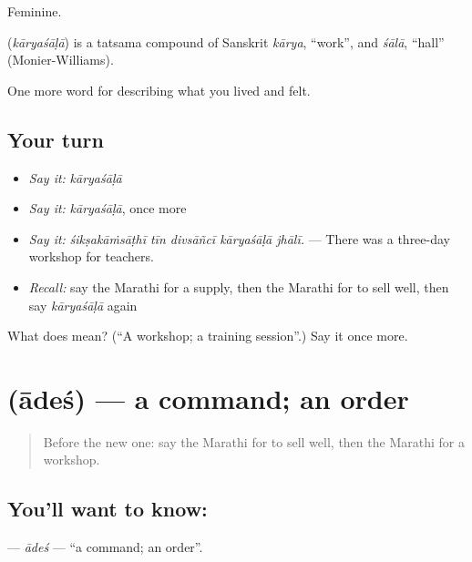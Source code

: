 Feminine.

\begin{cousinweb}
\textbf{} (\emph{kāryaśāḷā}) is a tatsama compound of Sanskrit \emph{kārya}, \textquotedblleft{}work\textquotedblright{}, and \emph{śālā}, \textquotedblleft{}hall\textquotedblright{} (Monier-Williams).
\end{cousinweb}

\begin{grammarlens}[title={What you've built}]
One more word for describing what you lived and felt.
\end{grammarlens}

\subsection*{Your turn}
\begin{itemize}
\raggedright
  \item \emph{Say it:} \emph{kāryaśāḷā}
  \item \emph{Say it:} \emph{kāryaśāḷā}, once more
  \item \emph{Say it:} \emph{śikṣakāṁsāṭhī tīn divsāñcī kāryaśāḷā jhālī.} — There was a three-day workshop for teachers.
  \item \emph{Recall:} say the Marathi for a supply, then the Marathi for to sell well, then say \emph{kāryaśāḷā} again
\end{itemize}

\begin{tcolorbox}[breakable,colback=teal!4,colframe=teal!35!black,title={Before you move on}]
What does  mean? (\textquotedblleft{}A workshop; a training session\textquotedblright{}.) Say it once more.
\end{tcolorbox}
\section[\texorpdfstring{\mr{आदेश} (ādeś)}{आदेश (ādeś)}]{ (ādeś) — a command; an order}

\label{lesson:MR-C513-ades}



\begin{quote}
Before the new one: say the Marathi for to sell well, then the Marathi for a workshop.
\end{quote}

\subsection*{You'll want to know: }
\textbf{} — \emph{ādeś} — \textquotedblleft{}a command; an order\textquotedblright{}.

